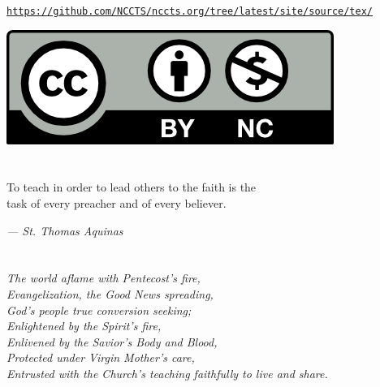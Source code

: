 \documentclass[oneside]{book}
\begin{document}
{\begin{center}
\texttt{\href{https://github.com/NCCTS/nccts.org/tree/latest/site/source/tex/}
             {https://github.com/NCCTS/nccts.org/tree/latest/site/source/tex/}}

\href{https://creativecommons.org/licenses/by-nc/3.0/}{
  \includegraphics[scale=0.6]{by-nc}
}

\end{center}
}
\pagebreak


\section*{} 

\vspace*{\fill}
\begin{center}

To teach in order to lead others to the faith is the \\ task of every preacher
and of every believer.

\emph{--- St. Thomas Aquinas}

\end{center}
\vspace*{\fill}
\pagebreak


\section*{} 

\vspace*{\fill}
\begin{center}

\emph{The world aflame with Pentecost's fire, \\
Evangelization, the Good News spreading, \\
God's people true conversion seeking; \\
Enlightened by the Spirit's fire, \\
Enlivened by the Savior's Body and Blood, \\
Protected under Virgin Mother's care, \\
Entrusted with the Church's teaching faithfully to live and share.}

\end{center}
\vspace*{\fill}
\pagebreak
\end{document}
